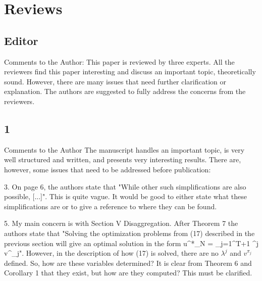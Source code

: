 \section{Reviews}
\subsection{Editor}
Comments to the Author:
This paper is reviewed by three experts. All the reviewers find this paper interesting and discuss an important topic, theoretically sound. However, there are many issues that need further clarification or explanation. The authors are suggested to fully address the concerns from the reviewers.


\subsection{1}
Comments to the Author
The manuscript handles an important topic, is very well structured and written, and presents very interesting results. There are, however, some issues that need to be addressed before publication:

3. On page 6, the authors state that "While other such simplifications are also possible, [...]". This is quite vague. It would be good to either state what these simplifications are or to give a reference to where they can be found.


5. My main concern is with Section V Disaggregation. After Theorem 7 the authors state that "Solving the optimization problems from (17) described in the previous section will give an optimal solution in the form u^*_N = \sum_{j=1}^{T+1} \lambda^j v^{\pi_j}". However, in the description of how (17) is solved, there are no $\lambda^j$ and $v^{\pi_j}$ defined. So, how are these variables determined? It is clear from Theorem 6 and Corollary 1 that they exist, but how are they computed? This must be clarified.


